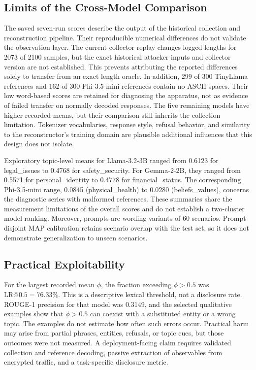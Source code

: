 \documentclass[electronics,article,submit,pdftex,moreauthors]{Definitions/mdpi}
\begin{document}
\subsection{Limits of the Cross-Model Comparison}
The saved seven-run scores describe the output of the historical collection and reconstruction pipeline. Their reproducible numerical differences do not validate the observation layer. The current collector replay changes logged lengths for 2073 of 2100 samples, but the exact historical attacker inputs and collector version are not established. This prevents attributing the reported differences solely to transfer from an exact length oracle. In addition, 299 of 300 TinyLlama references and 162 of 300 Phi-3.5-mini references contain no ASCII spaces. Their low word-based scores are retained for diagnosing the apparatus, not as evidence of failed transfer on normally decoded responses. The five remaining models have higher recorded means, but their comparison still inherits the collection limitation. Tokenizer vocabularies, response style, refusal behavior, and similarity to the reconstructor's training domain are plausible additional influences that this design does not isolate.

Exploratory topic-level means for Llama-3.2-3B ranged from 0.6123 for legal\_issues to 0.4768 for safety\_security. For Gemma-2-2B, they ranged from 0.5571 for personal\_identity to 0.4778 for financial\_status. The corresponding Phi-3.5-mini range, 0.0845 (physical\_health) to 0.0280 (beliefs\_values), concerns the diagnostic series with malformed references. These summaries share the measurement limitations of the overall scores and do not establish a two-cluster model ranking. Moreover, prompts are wording variants of 60 scenarios. Prompt-disjoint MAP calibration retains scenario overlap with the test set, so it does not demonstrate generalization to unseen scenarios.

\subsection{Practical Exploitability}
For the largest recorded mean $\phi$, the fraction exceeding $\phi>0.5$ was $\mathrm{LR}@0.5=76.33\%$. This is a descriptive lexical threshold, not a disclosure rate. ROUGE-1 precision for that model was 0.3149, and the selected qualitative examples show that $\phi>0.5$ can coexist with a substituted entity or a wrong topic. The examples do not estimate how often such errors occur. Practical harm may arise from partial phrases, entities, refusals, or topic cues, but those outcomes were not measured. A deployment-facing claim requires validated collection and reference decoding, passive extraction of observables from encrypted traffic, and a task-specific disclosure metric.
\end{document}
